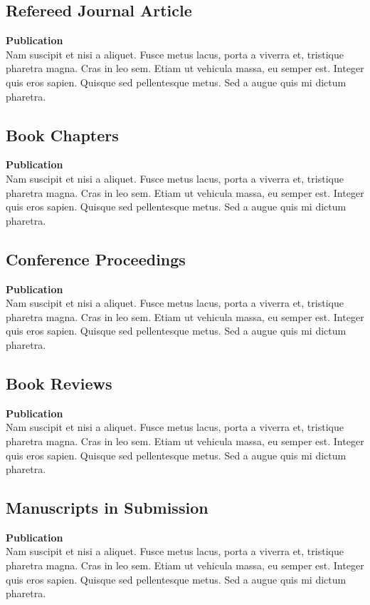 \documentclass{article}
\begin{document}
\subsection*{Refereed Journal Article}
\textbf{Publication} \\ 
Nam suscipit et nisi a aliquet. Fusce metus lacus, porta a viverra et, tristique pharetra magna. Cras in leo sem. Etiam ut vehicula massa, eu semper est. Integer quis eros sapien. Quisque sed pellentesque metus. Sed a augue quis mi dictum pharetra. 

\subsection*{Book Chapters}
\textbf{Publication} \\ 
Nam suscipit et nisi a aliquet. Fusce metus lacus, porta a viverra et, tristique pharetra magna. Cras in leo sem. Etiam ut vehicula massa, eu semper est. Integer quis eros sapien. Quisque sed pellentesque metus. Sed a augue quis mi dictum pharetra. 

\subsection*{Conference Proceedings}
\textbf{Publication} \\ 
Nam suscipit et nisi a aliquet. Fusce metus lacus, porta a viverra et, tristique pharetra magna. Cras in leo sem. Etiam ut vehicula massa, eu semper est. Integer quis eros sapien. Quisque sed pellentesque metus. Sed a augue quis mi dictum pharetra. 

\subsection*{Book Reviews}
\textbf{Publication} \\ 
Nam suscipit et nisi a aliquet. Fusce metus lacus, porta a viverra et, tristique pharetra magna. Cras in leo sem. Etiam ut vehicula massa, eu semper est. Integer quis eros sapien. Quisque sed pellentesque metus. Sed a augue quis mi dictum pharetra. 

\subsection*{Manuscripts in Submission}
\textbf{Publication} \\ 
Nam suscipit et nisi a aliquet. Fusce metus lacus, porta a viverra et, tristique pharetra magna. Cras in leo sem. Etiam ut vehicula massa, eu semper est. Integer quis eros sapien. Quisque sed pellentesque metus. Sed a augue quis mi dictum pharetra. 
\end{document}
